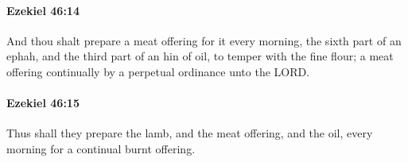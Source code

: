 		\paragraph{Ezekiel 46:14} %
			\label{EZEKIEL-46-14}

			And thou shalt prepare a meat offering for it every morning, the sixth part of an ephah, and the third part of an hin of oil, to temper with the fine flour; a meat offering continually by a perpetual ordinance unto the LORD.


		\paragraph{Ezekiel 46:15} %
			\label{EZEKIEL-46-15}

			Thus shall they prepare the lamb, and the meat offering, and the oil, every morning for a continual burnt offering.


